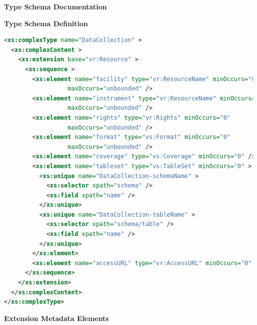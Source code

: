 \documentclass[11pt,a4paper]{ivoa}
\begin{document}
\begin{generated}
\begingroup
      	\renewcommand*\descriptionlabel[1]{%
      	\hbox to 5.5em{\emph{#1}\hfil}}\vspace{2ex}\noindent\textbf{ Type Schema Documentation}



\vspace{1ex}\noindent\textbf{ Type Schema Definition}

\begin{lstlisting}[language=XML,basicstyle=\footnotesize]
<xs:complexType name="DataCollection" >
  <xs:complexContent >
    <xs:extension base="vr:Resource" >
      <xs:sequence >
        <xs:element name="facility" type="vr:ResourceName" minOccurs="0"
                  maxOccurs="unbounded" />
        <xs:element name="instrument" type="vr:ResourceName" minOccurs="0"
                  maxOccurs="unbounded" />
        <xs:element name="rights" type="vr:Rights" minOccurs="0"
                  maxOccurs="unbounded" />
        <xs:element name="format" type="vs:Format" minOccurs="0"
                  maxOccurs="unbounded" />
        <xs:element name="coverage" type="vs:Coverage" minOccurs="0" />
        <xs:element name="tableset" type="vs:TableSet" minOccurs="0" >
          <xs:unique name="DataCollection-schemaName" >
            <xs:selector xpath="schema" />
            <xs:field xpath="name" />
          </xs:unique>
          <xs:unique name="DataCollection-tableName" >
            <xs:selector xpath="schema/table" />
            <xs:field xpath="name" />
          </xs:unique>
        </xs:element>
        <xs:element name="accessURL" type="vr:AccessURL" minOccurs="0" />
      </xs:sequence>
    </xs:extension>
  </xs:complexContent>
</xs:complexType>
\end{lstlisting}

\vspace{0.5ex}\noindent\textbf{ Extension Metadata Elements}


\end{generated}
\end{document}
